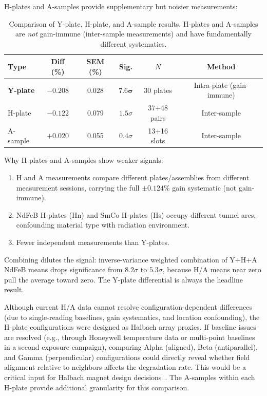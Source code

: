 \documentclass[11pt,letterpaper]{article}
\begin{document}
H-plates and A-samples provide supplementary but noisier measurements:

\begin{table}[H]
\centering
\caption{Comparison of Y-plate, H-plate, and A-sample results. H-plates and
A-samples are \emph{not} gain-immune (inter-sample measurements) and have
fundamentally different systematics.}
\label{tab:sample_types}
\begin{tabular}{@{}lccccc@{}}
\toprule
\textbf{Type} & \textbf{Diff (\%)} & \textbf{SEM (\%)} & \textbf{Sig.} &
$N$ & \textbf{Method} \\
\midrule
\textbf{Y-plate} & $\mathbf{-0.208}$ & $\mathbf{0.028}$ & $\mathbf{7.6\sigma}$ & 30 plates & Intra-plate (gain-immune) \\
H-plate & $-0.122$ & 0.079 & $1.5\sigma$ & 37+48 pairs & Inter-sample \\
A-sample & $+0.020$ & 0.055 & $0.4\sigma$ & 13+16 slots & Inter-sample \\
\bottomrule
\end{tabular}
\end{table}

Why H-plates and A-samples show weaker signals:
\begin{enumerate}
    \item H and A measurements compare different
    plates/assemblies from different measurement sessions, carrying the full
    $\pm 0.124\%$ gain systematic (not gain-immune).
    \item NdFeB H-plates (Hn) and SmCo H-plates
    (Hs) occupy different tunnel arcs, confounding material type with radiation
    environment.
    \item Fewer independent measurements than Y-plates.
\end{enumerate}

Combining dilutes the signal: inverse-variance weighted combination
of Y+H+A NdFeB means drops significance from $8.2\sigma$ to $5.3\sigma$,
because H/A means near zero pull the average toward zero. The Y-plate
differential is always the headline result.

Although current H/A data cannot resolve
configuration-dependent differences (due to single-reading baselines, gain
systematics, and location confounding), the H-plate configurations were
designed as Halbach array proxies. If baseline issues are resolved (e.g.,
through Honeywell temperature data or multi-point baselines in a second
exposure campaign), comparing Alpha (aligned), Beta (antiparallel), and
Gamma (perpendicular) configurations could directly reveal whether field
alignment relative to neighbors affects the degradation rate. This would be a critical input for Halbach magnet design
decisions~\cite{NGotta2024}. The A-samples within each H-plate provide
additional granularity for this comparison.
\end{document}
